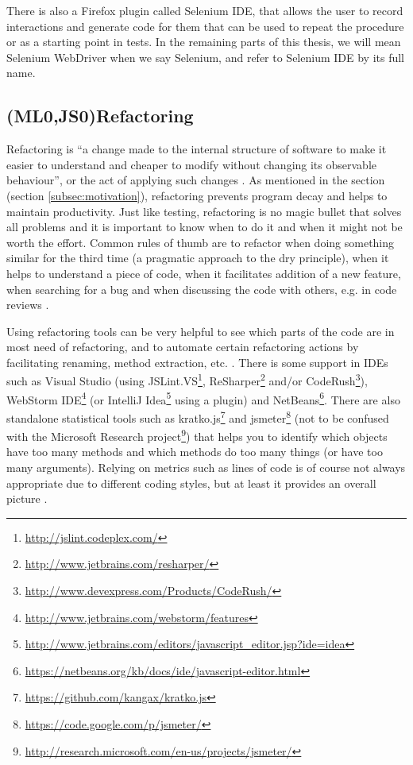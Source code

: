 \documentclass[11pt]{article}
\begin{document}
There is also a Firefox plugin called Selenium IDE, that allows the user to record interactions and generate code for them that can be used to repeat the procedure or as a starting point in tests. In the remaining parts of this thesis, we will mean Selenium WebDriver when we say Selenium, and refer to Selenium IDE by its full name.

\subsection{(ML0,JS0)Refactoring}
\label{subsec:refactor}

Refactoring is ``a change made to the internal structure of software to make it easier to understand and cheaper to modify without changing its observable behaviour'', or the act of applying such changes \cite[p.~46]{Refactoring}. As mentioned in the  section (section \ref{subsec:motivation}), refactoring prevents program decay and helps to maintain productivity. Just like testing, refactoring is no magic bullet that solves all problems and it is important to know when to do it and when it might not be worth the effort. Common rules of thumb are to refactor when doing something similar for the third time (a pragmatic approach to the \gls{dry} principle), when it helps to understand a piece of code, when it facilitates addition of a new feature, when searching for a bug and when discussing the code with others, e.g. in code reviews \cite[p.~49-51]{Refactoring}.

Using refactoring tools can be very helpful to see which parts of the code are in most need of refactoring, and to automate certain refactoring actions by facilitating renaming, method extraction, etc. \cite[ch.~5]{Legacy}. There is some support in IDEs such as Visual Studio (using
JSLint.VS\footnote{\url{http://jslint.codeplex.com/}},
ReSharper\footnote{\url{http://www.jetbrains.com/resharper/}} and/or
CodeRush\footnote{\url{http://www.devexpress.com/Products/CodeRush/}}),
WebStorm IDE\footnote{\url{http://www.jetbrains.com/webstorm/features}} (or
IntelliJ Idea\footnote{\url{http://www.jetbrains.com/editors/javascript_editor.jsp?ide=idea}} using a plugin) and
NetBeans\footnote{\url{https://netbeans.org/kb/docs/ide/javascript-editor.html}}. There are also standalone statistical tools such as
kratko.js\footnote{\url{https://github.com/kangax/kratko.js}} and
jsmeter\footnote{\url{https://code.google.com/p/jsmeter/}} (not to be confused with the
Microsoft Research project\footnote{\url{http://research.microsoft.com/en-us/projects/jsmeter/}}) that helps you to identify which objects have too many methods and which methods do too many things (or have too many arguments). Relying on metrics such as lines of code is of course not always appropriate due to different coding styles, but at least it provides an overall picture \cite{Kratko}.
\end{document}
